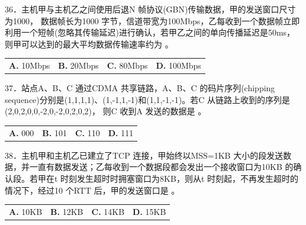 \documentclass[UTF8,11pt]{ctexart}
\begin{document}
36．主机甲与主机乙之间使用后退N 帧协议(GBN)传输数据，甲的发送窗口尺寸为1000， 数据帧长为1000 字节，信道带宽为100Mbps，乙每收到一个数据帧立即利用一个短帧(忽略其传输延迟)进行确认，若甲乙之间的单向传播延迟是50ms，则甲可以达到的最大平均数据传输速率约为 。


\begin{center}\begin{tabular}{>{\raggedright\arraybackslash}p{\dimexpr(\linewidth-8\tabcolsep)/4\relax}>{\raggedright\arraybackslash}p{\dimexpr(\linewidth-8\tabcolsep)/4\relax}>{\raggedright\arraybackslash}p{\dimexpr(\linewidth-8\tabcolsep)/4\relax}>{\raggedright\arraybackslash}p{\dimexpr(\linewidth-8\tabcolsep)/4\relax}}
\textbf{A.} 10Mbps & \textbf{B.} 20Mbps & \textbf{C.} 80Mbps & \textbf{D.} 100Mbps\\[.35em]\end{tabular}\end{center}

37．站点A、B、C 通过CDMA 共享链路，A、B、C 的码片序列(chipping sequence)分别是(1,1,1,1)、(1,-1,1,-1)和(1,1,-1,-1)。若C 从链路上收到的序列是(2,0,2,0,0,-2,0,-2,0,2,0,2)， 则C 收到A 发送的数据是 。


\begin{center}\begin{tabular}{>{\raggedright\arraybackslash}p{\dimexpr(\linewidth-8\tabcolsep)/4\relax}>{\raggedright\arraybackslash}p{\dimexpr(\linewidth-8\tabcolsep)/4\relax}>{\raggedright\arraybackslash}p{\dimexpr(\linewidth-8\tabcolsep)/4\relax}>{\raggedright\arraybackslash}p{\dimexpr(\linewidth-8\tabcolsep)/4\relax}}
\textbf{A.} 000 & \textbf{B.} 101 & \textbf{C.} 110 & \textbf{D.} 111\\[.35em]\end{tabular}\end{center}

38．主机甲和主机乙已建立了TCP 连接，甲始终以MSS=1KB 大小的段发送数据，并一直有数据发送；乙每收到一个数据段都会发出一个接收窗口为10KB 的确认段。若甲在t 时刻发生超时时拥塞窗口为8KB，则从t 时刻起，不再发生超时的情况下，经过10 个RTT 后，甲的发送窗口是 。


\begin{center}\begin{tabular}{>{\raggedright\arraybackslash}p{\dimexpr(\linewidth-8\tabcolsep)/4\relax}>{\raggedright\arraybackslash}p{\dimexpr(\linewidth-8\tabcolsep)/4\relax}>{\raggedright\arraybackslash}p{\dimexpr(\linewidth-8\tabcolsep)/4\relax}>{\raggedright\arraybackslash}p{\dimexpr(\linewidth-8\tabcolsep)/4\relax}}
\textbf{A.} 10KB & \textbf{B.} 12KB & \textbf{C.} 14KB & \textbf{D.} 15KB\\[.35em]\end{tabular}\end{center}
\end{document}
